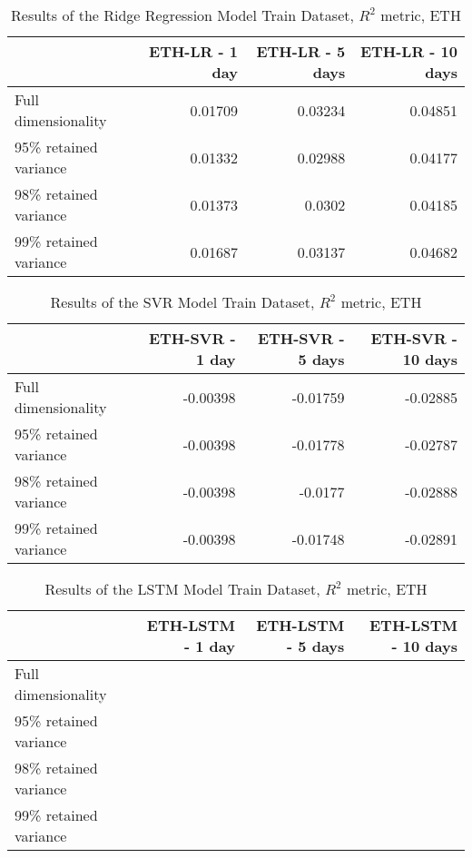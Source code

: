 

\begin{table}[htbp]
    \centering
    \caption{Results of the Ridge Regression Model Train Dataset, $R^2$ metric, ETH}
    \begin{tabular}{lrrr}
        \toprule
        {} &  ETH-LR - 1 day &  ETH-LR - 5 days &  ETH-LR - 10 days \\
        \midrule
        Full dimensionality   &      0.01709    &     0.03234     &        0.04851    \\
        95\% retained variance &     0.01332    &   0.02988 &     0.04177     \\
        98\% retained variance &    0.01373   &     0.0302   &    0.04185  \\
        99\% retained variance &   0.01687    &     0.03137    &  0.04682   \\
        \bottomrule
    \end{tabular}
    \end{table}
    
    
    \begin{table}[htbp]
        \centering
        \caption{Results of the SVR Model Train Dataset, $R^2$ metric, ETH}
    \begin{tabular}{lrrr}
        \toprule
        {} &  ETH-SVR - 1 day &  ETH-SVR - 5 days &  ETH-SVR - 10 days \\
        \midrule
        Full dimensionality   &  -0.00398   &    -0.01759     &   -0.02885       \\
        95\% retained variance &  -0.00398  &    -0.01778     &   -0.02787        \\
        98\% retained variance &  -0.00398   &   -0.0177      &   -0.02888      \\
        99\% retained variance &  -0.00398  &    -0.01748     &  -0.02891   \\
        \bottomrule
    \end{tabular}
    \end{table}
    
    \begin{table}[htbp]
        \centering
        \caption{Results of the LSTM Model Train Dataset, $R^2$ metric, ETH}
    \begin{tabular}{lrrr}
        \toprule
        {} &  ETH-LSTM - 1 day &  ETH-LSTM - 5 days &  ETH-LSTM - 10 days \\
        \midrule
        Full dimensionality   &       &           &           \\
        95\% retained variance &       &           &            \\
        98\% retained variance &       &          &            \\
        99\% retained variance &      &       &           \\
        \bottomrule
    \end{tabular}
    \end{table}
    
